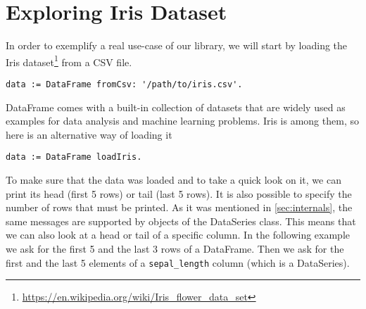 \documentclass[sigplan]{acmart}
\begin{document}

\section{Exploring Iris Dataset}
\label{sec:iris-eda}
%
%

In order to exemplify a real use-case of our library, we will start by loading the Iris dataset\footnote{\url{https://en.wikipedia.org/wiki/Iris_flower_data_set}} from a CSV file.

\begin{lstlisting}[basicstyle=\small,language=Smalltalk]
data := DataFrame fromCsv: '/path/to/iris.csv'.
\end{lstlisting}

DataFrame comes with a built-in collection of datasets that are widely used as examples for data analysis and machine learning problems. Iris is among them, so here is an alternative way of loading it

\begin{lstlisting}[basicstyle=\small,language=Smalltalk]
data := DataFrame loadIris.
\end{lstlisting}

To make sure that the data was loaded and to take a quick look on it, we can print its head (first 5 rows) or tail (last 5 rows). It is also possible to specify the number of rows that must be printed. As it was mentioned in \ref{sec:internals}, the same messages are supported by objects of the DataSeries class. This means that we can also look at a head or tail of a specific column. In the following example we ask for the first 5 and the last 3 rows of a DataFrame. Then we ask for the first and the last 5 elements of a \texttt{sepal\_length} column (which is a DataSeries).
\end{document}
